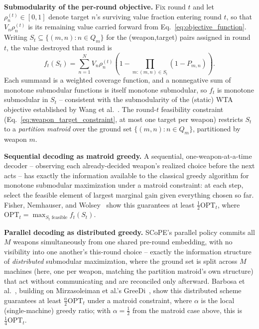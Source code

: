 \documentclass[smallcondensed]{svjour3}
\begin{document}
\textbf{Submodularity of the per-round objective.} Fix round $t$ and let $\rho_n^{(t)}\in[0,1]$ denote target $n$'s surviving value fraction entering round $t$, so that $V_n\rho_n^{(t)}$ is its remaining value carried forward from Eq.~\eqref{eq:objective_function}. Writing $S_t \subseteq \{(m,n): n\in Q_m\}$ for the (weapon,target) pairs assigned in round $t$, the value destroyed that round is
\begin{equation}
\label{eq:round-obj}
f_t(S_t) = \sum_{n=1}^N V_n\rho_n^{(t)}\left(1 - \!\!\prod_{m:(m,n)\in S_t}\!\!(1-P_{m,n})\right).
\end{equation}
Each summand is a weighted coverage function, and a nonnegative sum of monotone submodular functions is itself monotone submodular, so $f_t$ is monotone submodular in $S_t$ -- consistent with the submodularity of the (static) WTA objective established by Wang et al.~\cite{wang2013weapon}. The round-$t$ feasibility constraint (Eq.~\eqref{eq:weapon_target_constraint}, at most one target per weapon) restricts $S_t$ to a \emph{partition matroid} over the ground set $\{(m,n):n\in Q_m\}$, partitioned by weapon $m$.

\textbf{Sequential decoding as matroid greedy.} A sequential, one-weapon-at-a-time decoder -- observing each already-decided weapon's realized choice before the next acts -- has exactly the information available to the classical greedy algorithm for monotone submodular maximization under a matroid constraint: at each step, select the feasible element of largest marginal gain given everything chosen so far. Fisher, Nemhauser, and Wolsey~\cite{fisher1978analysis} show this guarantees at least $\frac12\text{OPT}_t$, where $\text{OPT}_t = \max_{S_t\text{ feasible}} f_t(S_t)$.

\textbf{Parallel decoding as distributed greedy.} SCoPE's parallel policy commits all $M$ weapons simultaneously from one shared pre-round embedding, with no visibility into one another's this-round choice -- exactly the information structure of \emph{distributed} submodular maximization, where the ground set is split across $M$ machines (here, one per weapon, matching the partition matroid's own structure) that act without communicating and are reconciled only afterward. Barbosa et al.~\cite{barbosa2015power}, building on Mirzasoleiman et al.'s GreeDi~\cite{mirzasoleiman2016distributed}, show this distributed scheme guarantees at least $\frac{\alpha}{2}\text{OPT}_t$ under a matroid constraint, where $\alpha$ is the local (single-machine) greedy ratio; with $\alpha=\frac12$ from the matroid case above, this is $\frac14\text{OPT}_t$.
\end{document}
